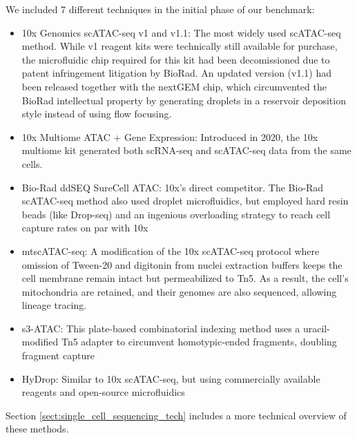 We included 7 different techniques in the initial phase of our benchmark:

\begin{itemize}[noitemsep]
	\item 10x Genomics scATAC-seq v1 and v1.1: The most widely used scATAC-seq method. While v1 reagent kits were technically still available for purchase, the microfluidic chip required for this kit had been decomissioned due to patent infringement litigation by BioRad. An updated version (v1.1) had been released together with the nextGEM chip, which circumvented the BioRad intellectual property by generating droplets in a reservoir deposition style instead of using flow focusing.
	\item 10x Multiome ATAC + Gene Expression: Introduced in 2020, the 10x multiome kit generated both scRNA-seq and scATAC-seq data from the same cells.
	\item Bio-Rad ddSEQ SureCell ATAC: 10x's direct competitor. The Bio-Rad scATAC-seq method also used droplet microfluidics, but employed hard resin beads (like Drop-seq) and an ingenious overloading strategy to reach cell capture rates on par with 10x
	\item mtscATAC-seq: A modification of the 10x scATAC-seq protocol where omission of Tween-20 and digitonin from nuclei extraction buffers keeps the cell membrane remain intact but permeabilized to Tn5. As a result, the cell's mitochondria are retained, and their genomes are also sequenced, allowing lineage tracing.
	\item s3-ATAC: This plate-based combinatorial indexing method uses a uracil-modified Tn5 adapter to circumvent homotypic-ended fragments, doubling fragment capture
	\item HyDrop: Similar to 10x scATAC-seq, but using commercially available reagents and open-source microfluidics
\end{itemize}

Section \autoref{sect:single_cell_sequencing_tech} includes a more technical overview of these methods.

